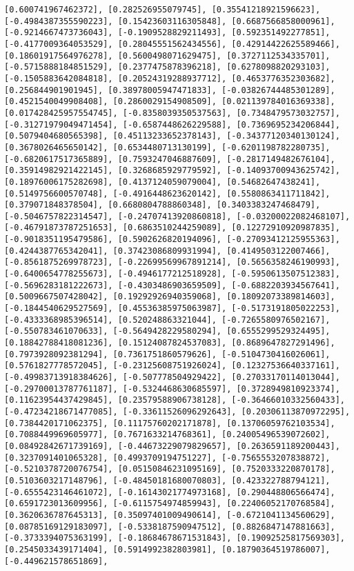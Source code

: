 \documentclass[11pt]{article}
\begin{document}
\begin{Verbatim}[commandchars=\\\{\}]
[0.600741967462372], [0.282526955079745], [0.35541218921596623], [-0.4984387355590223], [0.15423603116305848], [0.6687566858000961], [-0.9214667473736043], [-0.1909528829211493], [0.592351492277851], [-0.4177009364053529], [0.28045551562434556], [0.42914422625589466], [0.18601917564976278], [0.5600498071629475], [0.3727112534335701], [-0.5715888184851529], [0.2377475878396218], [0.6278098820293103], [-0.1505883642084818], [0.20524319288937712], [0.4653776352303682], [0.256844901901945], [0.38978005947471833], [-0.03826744485301289], [0.4521540049908408], [0.2860029154908509], [0.021139784016369338], [0.017428425957554745], [-0.8358039350537563], [0.7348479573032757], [-0.31271979049471454], [-0.6587448626229588], [0.7369695234206844], [0.5079404680565398], [0.45113233652378143], [-0.34377120340130124], [0.3678026465650142], [0.6534480713130199], [-0.6201198782280735], [-0.6820617517365889], [0.7593247046887609], [-0.2817149482676104], [0.35914982921422145], [0.3268685929779592], [-0.14093700943625742], [0.18976006175282698], [0.4137124059079004], [0.54682647438241], [0.5149756600570748], [-0.4916448623620142], [0.5580863411711842], [0.379071848378504], [0.6680804788860348], [0.3403383247468479], [-0.5046757822314547], [-0.24707413920860818], [-0.03200022082468107], [-0.46791873787251653], [0.6863510244259089], [0.12272910920987835], [-0.9018351195479586], [0.5902626820194096], [-0.27093412125955363], [0.4244387765342041], [0.37423086809931994], [0.4149503122007466], [-0.8561875269978723], [-0.22699569967891214], [0.5656358246190993], [-0.6400654778255673], [-0.4946177212518928], [-0.5950613507512383], [-0.5696283181222673], [-0.4303486903659509], [-0.6882203934567641], [0.5009667507428042], [0.19292926940359068], [0.18092073389814603], [-0.1844540629527569], [0.45536385975063987], [-0.5173191805022253], [-0.4333368985396514], [0.520248863321044], [-0.7265580976502167], [-0.550783461070633], [-0.5649428229580294], [0.6555299529324495], [0.18842788418081236], [0.15124087824537083], [0.8689647827291496], [0.7973928092381294], [0.7361751860579626], [-0.5104730416026061], [0.5761827778572045], [-0.23125608751926024], [0.12327536640337161], [-0.49983713918384626], [-0.507778504929422], [0.27033170114013044], [-0.29700013787761187], [-0.5324468630685597], [0.3728949810923374], [0.11623954437429845], [0.23579588906738128], [-0.36466010332560433], [-0.47234218671477085], [-0.33611526096292643], [0.20306113870972295], [0.7384420171062375], [0.11175760202171878], [0.13706059762103534], [0.7088449969605977], [0.7671633214768361], [0.24005496539072602], [0.08492842671739169], [-0.44673229079829657], [0.2636591189200443], [0.3237091401065328], [0.4993709194751227], [-0.7565553207838872], [-0.5210378720076754], [0.05150846231095169], [0.7520333220870178], [0.5103603217148796], [-0.48450181680070803], [0.423322788794121], [-0.6555423146461072], [-0.16143021774973168], [0.290448806566474], [0.6591723013609956], [-0.6115754974859943], [0.22406052170768584], [0.3620636787645313], [0.35097401009490614], [-0.6721041134560629], [0.08785169129183097], [-0.5338187590947512], [0.8826847147881663], [-0.3733394075363199], [-0.18684678671531843], [0.19092525817569303], [0.2545033439171404], [0.5914992382803981], [0.18790364519786007], [-0.449621578651869], 
\end{Verbatim}
\end{document}
